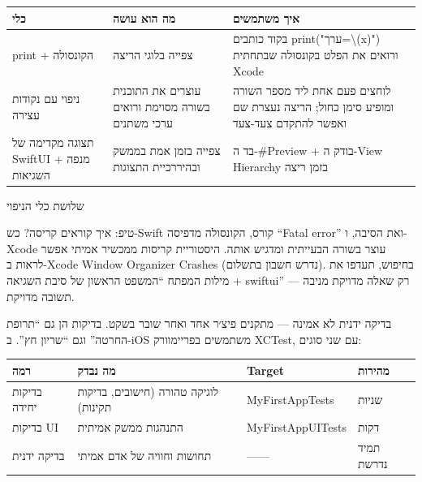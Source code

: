 


\begin{center}
\begin{tabularx}{\linewidth}{|X|X|X|}
\hline
\textbf{כלי} & \textbf{מה הוא עושה} & \textbf{איך משתמשים} \tabularnewline
\hline
print + הקונסולה & צפייה בלוגי הריצה & בקוד כותבים print("ערך=\textbackslash{}(x)") ורואים את הפלט בקונסולה שבתחתית Xcode \tabularnewline
ניפוי עם נקודות עצירה & עוצרים את התוכנית בשורה מסוימת ורואים ערכי משתנים & לוחצים פעם אחת ליד מספר השורה ומופיע סימן כחול; הריצה נעצרת שם ואפשר להתקדם צעד-צעד \tabularnewline
תצוגה מקדימה של SwiftUI + מנפה השגיאות & צפייה בזמן אמת בממשק ובהיררכיית התצוגות & בד ה-\#Preview + בודק ה-View Hierarchy בזמן ריצה \tabularnewline
\hline
\end{tabularx}
\end{center}

\begin{center}\small\color{gray}שלושת כלי הניפוי\end{center}

\begin{tcbinfo}{טיפ: איך קוראים קריסה?}
כש-Swift קורס, הקונסולה מדפיסה “Fatal error” ואת הסיבה, ו-Xcode עוצר בשורה הבעייתית ומדגיש אותה. היסטוריית קריסות ממכשיר אמיתי אפשר לראות ב-Xcode Window Organizer Crashes (נדרש חשבון בתשלום). בחיפוש, תעדפו את מילות המפתח “המשפט הראשון של סיבת השגיאה + swiftui” — רק שאלה מדויקת מניבה תשובה מדויקת.

\end{tcbinfo}


בדיקה ידנית לא אמינה — מתקנים פיצ׳ר אחד ואחר שובר בשקט. בדיקות הן גם “תרופת החרטה” וגם “שריון חץ”. ב-iOS משתמשים בפריימוורק XCTest, עם שני סוגים:

\begin{center}
\begin{tabularx}{\linewidth}{|X|X|X|X|}
\hline
\textbf{רמה} & \textbf{מה נבדק} & \textbf{Target} & \textbf{מהירות} \tabularnewline
\hline
בדיקות יחידה & לוגיקה טהורה (חישובים, בדיקות תקינות) & MyFirstAppTests & שניות \tabularnewline
בדיקות UI & התנהגות ממשק אמיתית & MyFirstAppUITests & דקות \tabularnewline
בדיקה ידנית & תחושות וחוויה של אדם אמיתי & —— & תמיד נדרשת \tabularnewline
\hline
\end{tabularx}
\end{center}

